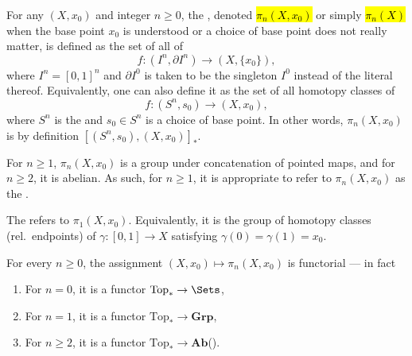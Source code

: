 \begin{definition} \label{definition:homotopy_groups_of_a_pointed_topological_space}
For any  $(X,x_0)$ and integer $n \ge 0$, the , denoted \hl{$\pi_n(X,x_0)$} or simply \hl{$\pi_n(X)$} when the base point $x_0$ is understood or a choice of base point does not really matter, is defined as the set of all  of 
$$f : (I^n, \partial I^n) \to (X,\{x_0\}),$$
where $I^n = [0,1]^n$ and $\partial I^0$ is taken to be the singleton $I^0$ instead of the literal  thereof. Equivalently, one can also define it as the set of all homotopy classes of 
$$f: (S^n, s_0) \to (X,x_0),$$
where $S^n$ is the  and $s_0 \in S^n$ is a choice of base point. In other words, $\pi_n(X,x_0)$ is by definition $[(S^n, s_0), (X,x_0)]_{*}$.

For $n \ge 1$, $\pi_n(X,x_0)$ is a group under concatenation of pointed maps, and for $n \ge 2$, it is abelian. As such, for $n \geq 1$, it is appropriate to refer to $\pi_n(X,x_0)$ as the .

The  refers to $\pi_1(X,x_0)$. Equivalently, it is the group of homotopy classes (rel.\ endpoints) of  $\gamma : [0,1] \to X$ satisfying $\gamma(0)=\gamma(1)=x_0$. 

For every $n \ge 0$, the assignment $(X,x_0) \mapsto \pi_n(X,x_0)$ is functorial --- in fact
\begin{enumerate}
    \item For $n = 0$, it is a functor $\mathrm{Top}_* \to \Sets$,
    \item For $n = 1$, it is a functor $\mathrm{Top}_* \to \mathbf{Grp}$,
    \item For $n \geq 2$, it is a functor $\mathrm{Top}_* \to \mathbf{Ab}$().
\end{enumerate}


\end{definition}

